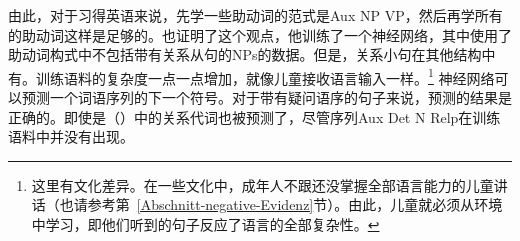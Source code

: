 由此，对于习得英语来说，先学一些助动词的范式是Aux NP VP，然后再学所有的助动词这样是足够的。\citet{LE2001a}也证明了这个观点，他训练了一个神经网络，其中使用了助动词构式中不包括带有关系从句的NPs的数据。但是，关系小句在其他结构中有。训练语料的复杂度一点一点增加，就像儿童接收语言输入一样\citep{Elman93a}。\footnote{
这里有文化差异。在一些文化中，成年人不跟还没掌握全部语言能力的儿童讲话\citep{Ochs82a,OS85a}（也请参考第~\ref{Abschnitt-negative-Evidenz}节）。由此，儿童就必须从环境中学习，即他们听到的句子反应了语言的全部复杂性。
} 神经网络可以预测一个词语序列的下一个符号。对于带有疑问语序的句子来说，预测的结果是正确的。即使是（）中的关系代词也被预测了，尽管序列Aux Det N Relp在训练语料中并没有出现。
